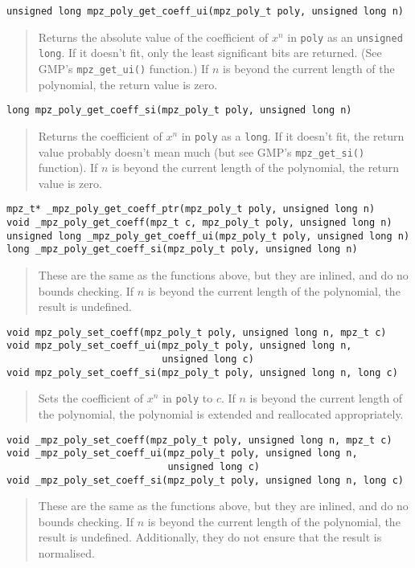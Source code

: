 \documentclass[a4paper,10pt]{article}
\newcommand{\code}{\lstinline}
\begin{document}
\begin{lstlisting}
unsigned long mpz_poly_get_coeff_ui(mpz_poly_t poly, unsigned long n)
\end{lstlisting}
\begin{quote}
Returns the absolute value of the coefficient of $x^n$ in \code{poly} as an \code{unsigned long}. If it doesn't fit, only the least significant bits are returned. (See GMP's \code{mpz_get_ui()} function.) If $n$ is beyond the current length of the polynomial, the return value is zero.
\end{quote}


\begin{lstlisting}
long mpz_poly_get_coeff_si(mpz_poly_t poly, unsigned long n)
\end{lstlisting}
\begin{quote}
Returns the coefficient of $x^n$ in \code{poly} as a \code{long}. If it doesn't fit, the return value probably doesn't mean much (but see GMP's \code{mpz_get_si()} function). If $n$ is beyond the current length of the polynomial, the return value is zero.
\end{quote}

\begin{lstlisting}
mpz_t* _mpz_poly_get_coeff_ptr(mpz_poly_t poly, unsigned long n)
void _mpz_poly_get_coeff(mpz_t c, mpz_poly_t poly, unsigned long n)
unsigned long _mpz_poly_get_coeff_ui(mpz_poly_t poly, unsigned long n)
long _mpz_poly_get_coeff_si(mpz_poly_t poly, unsigned long n)
\end{lstlisting}
\begin{quote}
These are the same as the functions above, but they are inlined, and do no bounds checking. If $n$ is beyond the current length of the polynomial, the result is undefined.
\end{quote}


\begin{lstlisting}
void mpz_poly_set_coeff(mpz_poly_t poly, unsigned long n, mpz_t c)
void mpz_poly_set_coeff_ui(mpz_poly_t poly, unsigned long n,
                           unsigned long c)
void mpz_poly_set_coeff_si(mpz_poly_t poly, unsigned long n, long c)
\end{lstlisting}
\begin{quote}
Sets the coefficient of $x^n$ in \code{poly} to $c$. If $n$ is beyond the current length of the polynomial, the polynomial is extended and reallocated appropriately.
\end{quote}


\begin{lstlisting}
void _mpz_poly_set_coeff(mpz_poly_t poly, unsigned long n, mpz_t c)
void _mpz_poly_set_coeff_ui(mpz_poly_t poly, unsigned long n,
                            unsigned long c)
void _mpz_poly_set_coeff_si(mpz_poly_t poly, unsigned long n, long c)
\end{lstlisting}
\begin{quote}
These are the same as the functions above, but they are inlined, and do no bounds checking. If $n$ is beyond the current length of the polynomial, the result is undefined. Additionally, they do not ensure that the result is normalised.
\end{quote}
\end{document}
